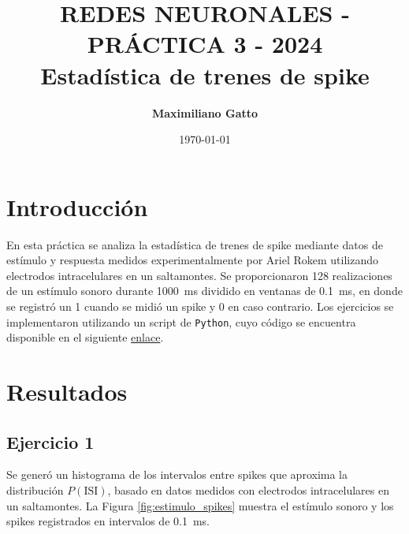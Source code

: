 \documentclass[11pt, twocolumn]{article}
\title{{\large REDES NEURONALES - PRÁCTICA 3 - 2024} \\ \vspace{1cm}\textbf{Estadística de trenes de spike}}
\author[ ]{\textbf{Maximiliano Gatto}}
\affil[ ]{Instituto Balseiro (UNCuyo - CNEA) - Bariloche, Río Negro, Argentina\vspace{0.4cm}}
\affil[ ]{\href{mailto:maximiliano.gatto@ib.edu.ar}{maximiliano.gatto@ib.edu.ar}}
\date{\today}
\begin{document}
\maketitle

\section{Introducción}

En esta práctica se analiza la estadística de trenes de spike mediante datos de estímulo y respuesta medidos experimentalmente por Ariel Rokem utilizando electrodos intracelulares en un saltamontes. Se proporcionaron 128 realizaciones de un estímulo sonoro durante \SI{1000}{\milli\second} dividido en ventanas de \SI{0.1}{\milli\second}, en donde se registró un 1 cuando se midió un spike y 0 en caso contrario. Los ejercicios se implementaron utilizando un script de \texttt{Python}, cuyo código se encuentra disponible en el siguiente \href{https://github.com/elmasi2393/Redes-neuronales/tree/main}{enlace}.


\section{Resultados}

\subsection*{Ejercicio 1}

Se generó un histograma de los intervalos entre spikes que aproxima la distribución \(P(\text{ISI})\), basado en datos medidos con electrodos intracelulares en un saltamontes. La Figura \ref{fig:estimulo_spikes} muestra el estímulo sonoro y los spikes registrados en intervalos de \SI{0.1}{\milli\second}.
\end{document}
